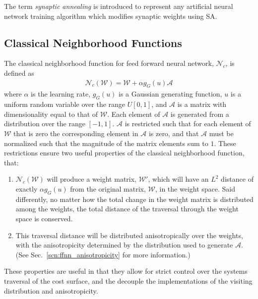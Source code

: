 \documentclass[11pt]{afthesis}
\begin{document}
	The term \textit{synaptic annealing} is introduced to represent any artificial neural network training algorithm which modifies synaptic weights using SA.
	
	
	\subsection{Classical Neighborhood Functions}
	\label{scn:classical_neighborhood}
	
	The classical neighborhood function for feed forward neural network, \begin{math}\mathcal{N}_{c}\end{math}, is defined as \begin{align}\label{eq:classical_anisotropic_neighborhood}
	\mathcal{N}_{c} (\boldsymbol{\mathcal{W}}) = \boldsymbol{\mathcal{W}} + \alpha g_{G}(u) \boldsymbol{\mathcal{A}} 
	\end{align}
	\noindent where $\alpha$ is the learning rate, $g_{G}(u)$ is a Gaussian generating function, $u$ is a uniform random variable over the range $U[0,1]$, and $\boldsymbol{\mathcal{A}}$ is a matrix with dimensionality equal to that of $\boldsymbol{\mathcal{W}}$. Each element of $\boldsymbol{\mathcal{A}}$ is generated from a distribution over the range $[-1,1]$.  $\boldsymbol{\mathcal{A}}$ is restricted such that for each element of $\boldsymbol{\mathcal{W}}$ that is zero the corresponding element in $\boldsymbol{\mathcal{A}}$ is zero, and that $\boldsymbol{\mathcal{A}}$ must be normalized such that the magnitude of the matrix elements sum to $1$. These restrictions ensure two useful properties of the classical neighborhood function, that: 
	
	\begin{enumerate}
		\item $\mathcal{N}_{c} (\boldsymbol{\mathcal{W}})$ will produce a weight matrix, $\boldsymbol{\mathcal{W}'}$, which will have an $L^2$ distance of exactly $\alpha g_{G}(u)$ from the original matrix, $\boldsymbol{\mathcal{W}}$, in the weight space. Said differently, no matter how the total change in the weight matrix is distributed among the weights, the total distance of the traversal through the weight space is conserved.
		\item This traversal distance will be distributed anisotropically over the weights, with the anisotropicity determined by the distribution used to generate $\boldsymbol{\mathcal{A}}$. (See Sec.~\ref{scn:ffnn_anisotropicity} for more information.)
	\end{enumerate}
	These properties are useful in that they allow for strict control over the systems traversal of the cost surface, and the decouple the implementations of the visiting distribution and anisotropicity.
	
\end{document}
